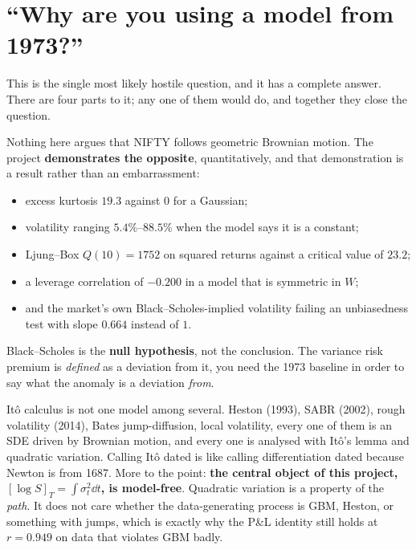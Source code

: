 \documentclass[11pt,a4paper]{article}
\begin{document}
\section{``Why are you using a model from 1973?''}
\label{sec:1973}

This is the single most likely hostile question, and it has a complete answer. There are four
parts to it; any one of them would do, and together they close the question.

\begin{keybox}
Nothing here argues that NIFTY follows geometric Brownian motion. The project
\textbf{demonstrates the opposite}, quantitatively, and that demonstration is a result rather
than an embarrassment:
\begin{itemize}[leftmargin=*,topsep=1pt,itemsep=0pt]
  \item excess kurtosis $19.3$ against $0$ for a Gaussian;
  \item volatility ranging $5.4\%$--$88.5\%$ when the model says it is a constant;
  \item Ljung--Box $Q(10)=1752$ on squared returns against a critical value of $23.2$;
  \item a leverage correlation of $-0.200$ in a model that is symmetric in $W$;
  \item and the market's own Black--Scholes-implied volatility failing an unbiasedness test
        with slope $0.664$ instead of $1$.
\end{itemize}
Black--Scholes is the \textbf{null hypothesis}, not the conclusion. The variance risk premium
is \emph{defined} as a deviation from it, you need the 1973 baseline in order to say what
the anomaly is a deviation \emph{from}.
\end{keybox}

\begin{keybox}
It\^o calculus is not one model among several. Heston (1993), SABR (2002), rough volatility
(2014), Bates jump-diffusion, local volatility, every one of them is an SDE driven by
Brownian motion, and every one is analysed with It\^o's lemma and quadratic variation. Calling
It\^o dated is like calling differentiation dated because Newton is from 1687.
\smallskip
More to the point: \textbf{the central object of this project, $[\log S]_T=\int\sigma_t^2\dd t$,
is model-free}. Quadratic variation is a property of the \emph{path}. It does not care whether
the data-generating process is GBM, Heston, or something with jumps, which is exactly why
the P\&L identity still holds at $r=0.949$ on data that violates GBM badly.
\end{keybox}
\end{document}
